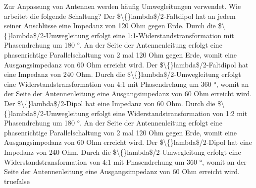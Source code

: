     {Zur Anpassung von Antennen werden häufig Umwegleitungen verwendet. Wie arbeitet die folgende Schaltung?}
    {Der \$\textbackslash\{\}lambda\$/2-Faltdipol hat an jedem seiner Anschlüsse eine Impedanz von 120 Ohm gegen Erde. Durch die \$\textbackslash\{\}lambda\$/2-Umwegleitung erfolgt eine 1:1-Widerstandstransformation mit Phasendrehung um 180 °. An der Seite der Antennenleitung erfolgt eine phasenrichtige Parallelschaltung von 2 mal 120 Ohm gegen Erde, womit eine Ausgangsimpedanz von 60 Ohm erreicht wird.
}
    {Der \$\textbackslash\{\}lambda\$/2-Faltdipol hat eine Impedanz von 240 Ohm. Durch die \$\textbackslash\{\}lambda\$/2-Umwegleitung erfolgt eine Widerstandstransformation von 4:1 mit Phasendrehung um 360 °, womit an der Seite der Antennenleitung eine Ausgangsimpedanz von 60 Ohm erreicht wird.}
    {Der \$\textbackslash\{\}lambda\$/2-Dipol hat eine Impedanz von 60 Ohm. Durch die \$\textbackslash\{\}lambda\$/2-Umwegleitung erfolgt eine Widerstandstransformation von 1:2 mit Phasendrehung um 180 °. An der Seite der Antennenleitung erfolgt eine phasenrichtige Parallelschaltung von 2 mal 120 Ohm gegen Erde, womit eine Ausgangsimpedanz von 60 Ohm erreicht wird.}
    {Der \$\textbackslash\{\}lambda\$/2-Dipol hat eine Impedanz von 240 Ohm. Durch die \$\textbackslash\{\}lambda\$/2-Umwegleitung erfolgt eine Widerstandstransformation von 4:1 mit Phasendrehung um 360 °, womit an der Seite der Antennenleitung eine Ausgangsimpedanz von 60 Ohm erreicht wird.}
    {true}{false}